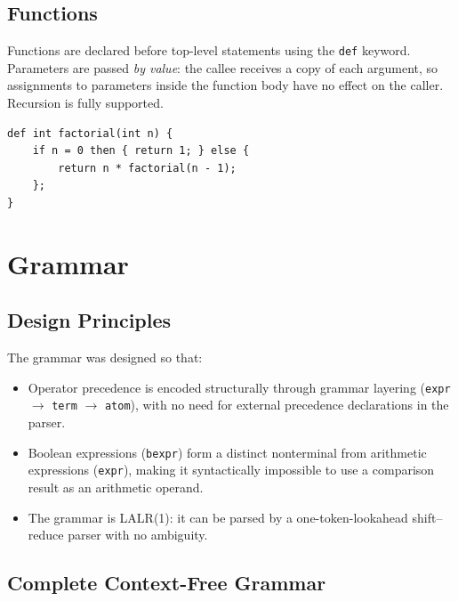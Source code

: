 \documentclass[12pt,a4paper]{report}
\begin{document}
\section{Functions}

Functions are declared before top-level statements using the \texttt{def}
keyword. Parameters are passed \emph{by value}: the callee receives a copy of
each argument, so assignments to parameters inside the function body have no
effect on the caller. Recursion is fully supported.

\begin{lstlisting}[caption={Function declaration syntax.}]
def int factorial(int n) {
    if n = 0 then { return 1; } else {
        return n * factorial(n - 1);
    };
}
\end{lstlisting}

\chapter{Grammar}

\section{Design Principles}

The grammar was designed so that:
\begin{itemize}
  \item Operator precedence is encoded structurally through grammar layering
        (\texttt{expr} $\to$ \texttt{term} $\to$ \texttt{atom}), with no
        need for external precedence declarations in the parser.
  \item Boolean expressions (\texttt{bexpr}) form a distinct nonterminal from
        arithmetic expressions (\texttt{expr}), making it syntactically
        impossible to use a comparison result as an arithmetic operand.
  \item The grammar is LALR(1): it can be parsed by a one-token-lookahead
        shift--reduce parser with no ambiguity.
\end{itemize}

\section{Complete Context-Free Grammar}
\end{document}
